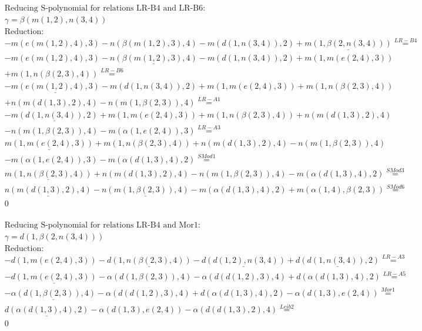 \documentclass[11pt]{amsart}
\begin{document}
\begin{align*} 
& \text{Reducing S-polynomial for relations LR-B4 and LR-B6:} \\ 
& \gamma = \beta(m(1,2),n(3,4)) \\ 
& \text{Reduction}: \\& - m(e(m(1,2),4),3) - n(\beta(m(1,2),3),4) - m(d(1,n(3,4)),2) + \underline{m(1,\beta(2,n(3,4)))} \stackrel{ LR-B4 }{=}  \\ 
& - m(e(m(1,2),4),3) - \underline{n(\beta(m(1,2),3),4)} - m(d(1,n(3,4)),2) + m(1,m(e(2,4),3))\\ 
 &  + m(1,n(\beta(2,3),4)) \stackrel{ LR-B6 }{=}  \\ 
& - \underline{m(e(m(1,2),4),3)} - m(d(1,n(3,4)),2) + m(1,m(e(2,4),3)) + m(1,n(\beta(2,3),4))\\ 
 &  + n(m(d(1,3),2),4) - n(m(1,\beta(2,3)),4) \stackrel{ LR-A1 }{=}  \\ 
& - \underline{m(d(1,n(3,4)),2)} + m(1,m(e(2,4),3)) + m(1,n(\beta(2,3),4)) + n(m(d(1,3),2),4)\\ 
 &  - n(m(1,\beta(2,3)),4) - m(\alpha(1,e(2,4)),3) \stackrel{ LR-A3 }{=}  \\ 
&\underline{m(1,m(e(2,4),3))} + m(1,n(\beta(2,3),4)) + n(m(d(1,3),2),4) - n(m(1,\beta(2,3)),4)\\ 
 &  - m(\alpha(1,e(2,4)),3) - m(\alpha(d(1,3),4),2) \stackrel{ SMod1 }{=}  \\ 
&\underline{m(1,n(\beta(2,3),4))} + n(m(d(1,3),2),4) - n(m(1,\beta(2,3)),4) - m(\alpha(d(1,3),4),2) \stackrel{ SMod3 }{=}  \\ 
&\underline{n(m(d(1,3),2),4)} - \underline{n(m(1,\beta(2,3)),4)} - m(\alpha(d(1,3),4),2) + m(\alpha(1,4),\beta(2,3)) \stackrel{ SMod6 }{=}  \\ 
&0\\ 
\end{align*} 
 
\begin{align*} 
& \text{Reducing S-polynomial for relations LR-B4 and Mor1:} \\ 
& \gamma = d(1,\beta(2,n(3,4))) \\ 
& \text{Reduction}: \\& - d(1,m(e(2,4),3)) - \underline{d(1,n(\beta(2,3),4))} - \underline{d(d(1,2),n(3,4))} + \underline{d(d(1,n(3,4)),2)} \stackrel{ LR-A3 }{=}  \\ 
& - \underline{d(1,m(e(2,4),3))} - \alpha(d(1,\beta(2,3)),4) - \alpha(d(d(1,2),3),4) + d(\alpha(d(1,3),4),2) \stackrel{ LR-A5 }{=}  \\ 
& - \underline{\alpha(d(1,\beta(2,3)),4)} - \alpha(d(d(1,2),3),4) + d(\alpha(d(1,3),4),2) - \alpha(d(1,3),e(2,4)) \stackrel{ Mor1 }{=}  \\ 
&\underline{d(\alpha(d(1,3),4),2)} - \alpha(d(1,3),e(2,4)) - \alpha(d(d(1,3),2),4) \stackrel{ Leib2 }{=}  \\ 
&0\\ 
\end{align*} 
 
\end{document}
